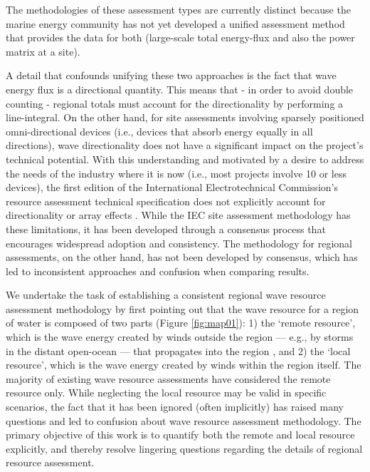 \documentclass[authoryear,preprint]{elsarticle}
\begin{document}
The methodologies of these assessment types are currently distinct because the marine energy community has not yet developed a unified assessment method that provides the data for both (large-scale total energy-flux and also the power matrix at a site). 

A detail that confounds unifying these two approaches is the fact that wave energy flux is a directional quantity. This means that - in order to avoid double counting - regional totals must account for the directionality by performing a line-integral. On the other hand, for site assessments involving sparsely positioned omni-directional devices (i.e., devices that absorb energy equally in all directions), wave directionality does not have a significant impact on the project’s technical potential. With this understanding and motivated by a desire to address the needs of the industry where it is now (i.e., most projects involve 10 or less devices), the first edition of the International Electrotechnical Commission’s resource assessment technical specification does not explicitly account for directionality or array effects \citep[]{internationalelectrotechnicalcommissionPart101Wave2015}. While the IEC site assessment methodology has these limitations, it has been developed through a consensus process that encourages widespread adoption and consistency. The methodology for regional assessments, on the other hand, has not been developed by consensus, which has led to inconsistent approaches and confusion when comparing results.

We undertake the task of establishing a consistent regional wave resource assessment methodology by first pointing out that the wave resource for a region of water is composed of two parts (Figure \ref{fig:map01}): 1) the ‘remote resource’, which is the wave energy created by winds outside the region — e.g., by storms in the distant open-ocean — that propagates into the region \citep{gunnQuantifyingGlobalWave2012, hemerRevisedAssessmentAustralia2017}, and 2) the ‘local resource’, which is the wave energy created by winds within the region itself. The majority of existing wave resource assessments have considered the remote resource only. While neglecting the local resource may be valid in specific scenarios, the fact that it has been ignored (often implicitly) has raised many questions and led to confusion about wave resource assessment methodology. The primary objective of this work is to quantify both the remote and local resource explicitly, and thereby resolve lingering questions regarding the details of regional resource assessment.
\end{document}
